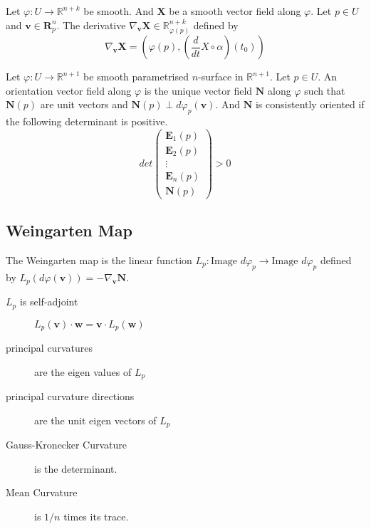 \begin{definition}
	Let $\varphi : U \to \mathbb{R}^{n+k}$ be smooth.
	And $\boldsymbol{X}$ be a smooth vector field along $\varphi$.
	Let $p \in U$ and $\boldsymbol{v} \in \boldsymbol{R}_p^n$.
	The derivative $\nabla_{\boldsymbol{v}} \boldsymbol{X} \in \mathbb{R}_{\varphi(p)}^{n+k}$ defined by
\begin{equation}
	\nabla_{\boldsymbol{v}} \boldsymbol{X} = \left( \varphi(p), \left( \frac{d}{dt} X \circ \alpha \right) (t_0) \right)
\end{equation}
\end{definition}

\begin{definition}
	Let $\varphi : U \to \mathbb{R}^{n+1}$ be smooth parametrised $n$-surface in $\mathbb{R}^{n+1}$.
	Let $p \in U$.
	An orientation vector field along $\varphi$ is the unique vector field $\boldsymbol{N}$ along $\varphi$ such that $\boldsymbol{N}(p)$ are unit vectors and $\boldsymbol{N}(p) \perp d\varphi_p(\boldsymbol{v})$.
	And $\boldsymbol{N}$ is consistently oriented if the following determinant is positive.
	\begin{equation}
		det\begin{pmatrix} \boldsymbol{E}_1(p) \\ \boldsymbol{E}_2(p) \\ \vdots \\ \boldsymbol{E}_n(p) \\ \boldsymbol{N}(p) \end{pmatrix} > 0
	\end{equation}
\end{definition}

\subsection{Weingarten Map}
\begin{definition}
	The Weingarten map is the linear function $L_p : \text{Image } d\varphi_p \to \text{Image }d\varphi_p$ defined by $L_p(d\varphi(\boldsymbol{v})) = -\nabla_{\boldsymbol{v}} \boldsymbol{N}$.
\end{definition}

\begin{description}
	\item[$L_p$ is self-adjoint] $L_p(\boldsymbol{v}) \cdot \boldsymbol{w} = \boldsymbol{v} \cdot L_p(\boldsymbol{w})$
	\item[principal curvatures] are the eigen values of $L_p$
	\item[principal curvature directions] are the unit eigen vectors of $L_p$
	\item[Gauss-Kronecker Curvature] is the determinant.
	\item[Mean Curvature] is $1/n$ times its trace.
\end{description}

